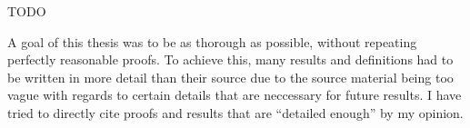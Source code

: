 TODO

A goal of this thesis was to be as thorough as possible, without repeating perfectly reasonable proofs. To achieve this, many results and definitions had to be written in more detail than their source due to the source material being too vague with regards to certain details that are neccessary for future results. I have tried to directly cite proofs and results that are ``detailed enough'' by my opinion.
